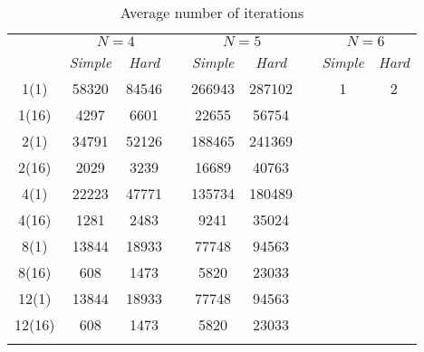 \documentclass[smallextended]{svjour3}       %
\begin{document}

\begin{table}
	\caption{Average number of iterations}
	\label{tab:2}
	\center
	\begin{tabular}{ccccccccc}
		\hline\noalign{\smallskip}
		\multirow{2}{*}{\textit{Node(core)}}	 & \multicolumn{2}{c}{ $N=4$ } & & \multicolumn{2}{c}{$N=5$}& & \multicolumn{2}{c}{$N=6$} \\
		\noalign{\smallskip} \cline{2-3} \cline{5-6} \cline{8-9} \noalign{\smallskip}
		 & \textit{Simple} & \textit{Hard} & & \textit{Simple} & \textit{Hard} & & \textit{Simple} & \textit{Hard}  \\
		\noalign{\smallskip} \hline \noalign{\smallskip}
1(1)	&	58320	&	84546	&	&	266943	&	287102 & & 1 & 2	\\
1(16)	&	4297	&	6601	&	&	22655	&	56754	& &  & \\
2(1)	&	34791	&	52126	&	&	188465	&	241369	& &  &\\
2(16)	&	2029	&	3239	&	&	16689	&	40763	& &  &\\
4(1)	&	22223	&	47771	&	&	135734	&	180489 & &  &	\\
4(16)	&	1281	&	2483	&	&	9241	&	35024	& &  &\\
8(1)	&	13844	&	18933	&	&	77748	&	94563	& &  &\\
8(16)	&	608	&	1473	&	&	5820	&	23033	& &  &\\
12(1)	&	13844	&	18933	&	&	77748	&	94563	& &  &\\
12(16)	&	608	&	1473	&	&	5820	&	23033	& &  &\\
		\noalign{\smallskip}\hline
	\end{tabular}
\end{table}
\end{document}
